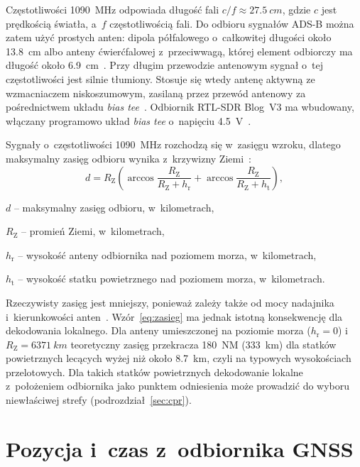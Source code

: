 Częstotliwości \SI{1090}{\mega\hertz} odpowiada długość fali $c/f \approx \SI{27.5}{cm}$, gdzie $c$ jest prędkością światła, a~$f$ częstotliwością fali. Do odbioru sygnałów ADS-B można zatem użyć prostych anten: dipola półfalowego o~całkowitej długości około \SI{13.8}{cm} albo anteny ćwierćfalowej z~przeciwwagą, której element odbiorczy ma długość około \SI{6.9}{cm}~\cite{sun2021}.
Przy długim przewodzie antenowym sygnał o~tej częstotliwości jest silnie tłumiony. Stosuje się wtedy antenę aktywną ze wzmacniaczem niskoszumowym, zasilaną przez przewód antenowy za pośrednictwem układu \textit{bias tee}~\cite{sun2021}. Odbiornik RTL-SDR Blog~V3 ma wbudowany, włączany programowo układ \textit{bias tee} o~napięciu \SI{4.5}{V}~\cite{rtlsdrv3}.

Sygnały o~częstotliwości \SI{1090}{\mega\hertz} rozchodzą się w~zasięgu wzroku, dlatego maksymalny zasięg odbioru wynika z~krzywizny Ziemi~\cite{sun2021}:
\begin{equation}
  d = R_{\mathrm{Z}} \left( \arccos\frac{R_{\mathrm{Z}}}{R_{\mathrm{Z}} + h_{\mathrm{r}}}
    + \arccos\frac{R_{\mathrm{Z}}}{R_{\mathrm{Z}} + h_{\mathrm{t}}} \right),
  \label{eq:zasieg}
\end{equation}
\begin{gdzie}
  \item $d$ -- maksymalny zasięg odbioru, w~kilometrach,
  \item $R_{\mathrm{Z}}$ -- promień Ziemi, w~kilometrach,
  \item $h_{\mathrm{r}}$ -- wysokość anteny odbiornika nad poziomem morza, w~kilometrach,
  \item $h_{\mathrm{t}}$ -- wysokość statku powietrznego nad poziomem morza, w~kilometrach.
\end{gdzie}
Rzeczywisty zasięg jest mniejszy, ponieważ zależy także od mocy nadajnika i~kierunkowości anten~\cite{sun2021}. Wzór~\eqref{eq:zasieg} ma jednak istotną konsekwencję dla dekodowania lokalnego. Dla anteny umieszczonej na poziomie morza ($h_{\mathrm{r}} = 0$) i~$R_{\mathrm{Z}} = \SI{6371}{km}$ teoretyczny zasięg przekracza \SI{180}{NM} (\SI{333}{km}) dla statków powietrznych lecących wyżej niż około \SI{8.7}{km}, czyli na typowych wysokościach przelotowych. Dla takich statków powietrznych dekodowanie lokalne z~położeniem odbiornika jako punktem odniesienia może prowadzić do wyboru niewłaściwej strefy (podrozdział~\ref{sec:cpr}).


\section{Pozycja i~czas z~odbiornika GNSS}


